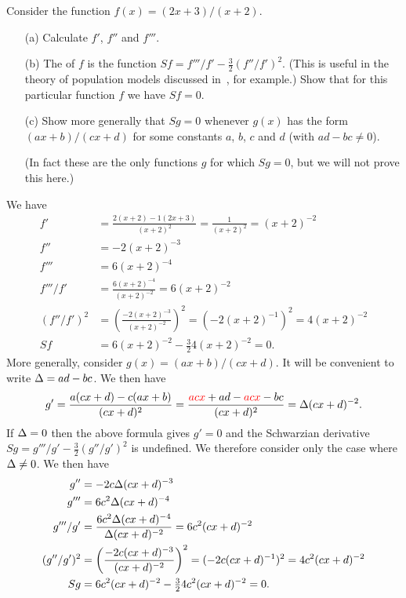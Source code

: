 \documentclass[a4paper]{book}
\theoremstyle{definition}
\newenvironment{starex}{
 \renewcommand{\thetheorem}{\arabic{chapter}.\arabic{section}.\arabic{theorem}${}^*$}
 \exercise
}{\endexercise}
\renewenvironment{solution}{\SolutionInline}{\endSolutionInline}
\begin{document}
\begin{starex}
 Consider the function $f(x)=(2x+3)/(x+2)$.  
 \begin{itemize}
  \item[(a)] Calculate $f'$, $f''$ and $f'''$.
  \item[(b)] The 
    of $f$ is the function
   $Sf=f'''/f'-\frac{3}{2}(f''/f')^2$.  (This is useful
   in the theory of population models discussed
   in~, for example.)  Show that for
   this particular function $f$ we have $Sf=0$.
  \item[(c)] Show more generally that $Sg=0$ whenever $g(x)$ has the
   form $(ax+b)/(cx+d)$ for some constants $a$, $b$, $c$ and $d$ (with
   $ad-bc\neq 0$).

   (In fact these are the only functions $g$ for which $Sg=0$, but we
   will not prove this here.)
 \end{itemize}
\end{starex}
\begin{solution}
 We have
 \begin{align*}
  f'   &= \frac{2(x+2)-1(2x+3)}{(x+2)^2} =
          \frac{1}{(x+2)^2} = (x+2)^{-2} \\
  f''  &= -2(x+2)^{-3} \\
  f''' &= 6(x+2)^{-4} \\
  f'''/f' &= \frac{6(x+2)^{-4}}{(x+2)^{-2}} = 6 (x+2)^{-2} \\
  (f''/f')^2 &= \left(\frac{-2(x+2)^{-3}}{(x+2)^{-2}}\right)^2 
              = (-2(x+2)^{-1})^2 = 4(x+2)^{-2} \\
  Sf &= 6(x+2)^{-2} - \tfrac{3}{2} 4(x+2)^{-2} = 0. 
 \end{align*}
 More generally, consider $g(x)=(ax+b)/(cx+d)$.  It will be convenient
 to write $\Delta=ad-bc$.  We then have
 \[ g' = \frac{a(cx+d) - c(ax+b)}{(cx+d)^2} 
       = \frac{{\color{red}acx} + ad - {\color{red}acx} - bc}{(cx+d)^2} 
       = \Delta (cx+d)^{-2}.
 \]
 If $\Delta=0$ then the above formula gives $g'=0$ and the Schwarzian
 derivative $Sg=g'''/g'-\frac{3}{2}(g''/g')^2$ is
 undefined.  We therefore consider only the case where $\Delta\neq 0$.
 We then have
 \begin{align*}
  g''  &= -2c\Delta(cx+d)^{-3} \\
  g''' &= 6c^2\Delta(cx+d)^{-4} \\
  g'''/g' &= \frac{6c^2\Delta(cx+d)^{-4}}{\Delta(cx+d)^{-2}} =
             6 c^2(cx+d)^{-2} \\
  (g''/g')^2 &= \left(\frac{-2c(cx+d)^{-3}}{(cx+d)^{-2}}\right)^2 
              = (-2c(cx+d)^{-1})^2 = 4c^2(cx+d)^{-2} \\
  Sg &= 6c^2(cx+d)^{-2} - \tfrac{3}{2} 4c^2(cx+d)^{-2} = 0. 
 \end{align*}
\end{solution}
\end{document}
